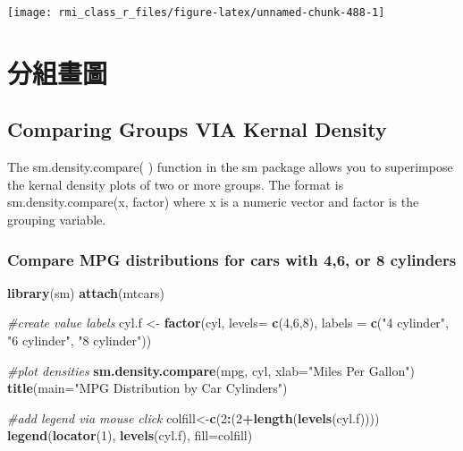 \documentclass[]{book}
\newenvironment{Shaded}{\begin{snugshade}}{\end{snugshade}}
\newcommand{\CommentTok}[1]{\textcolor[rgb]{0.56,0.35,0.01}{\textit{#1}}}
\newcommand{\DataTypeTok}[1]{\textcolor[rgb]{0.13,0.29,0.53}{#1}}
\newcommand{\DecValTok}[1]{\textcolor[rgb]{0.00,0.00,0.81}{#1}}
\newcommand{\KeywordTok}[1]{\textcolor[rgb]{0.13,0.29,0.53}{\textbf{#1}}}
\newcommand{\NormalTok}[1]{#1}
\newcommand{\OperatorTok}[1]{\textcolor[rgb]{0.81,0.36,0.00}{\textbf{#1}}}
\newcommand{\StringTok}[1]{\textcolor[rgb]{0.31,0.60,0.02}{#1}}
\theoremstyle{definition}
\theoremstyle{definition}
\theoremstyle{definition}
\theoremstyle{remark}
\begin{document}
\begin{center}\texttt{[image: rmi\_class\_r\_files/figure-latex/unnamed-chunk-488-1]} \end{center}

\section{分組畫圖}

\hypertarget{comparing-groups-via-kernal-density}{%
\subsection{Comparing Groups VIA Kernal
Density}\label{comparing-groups-via-kernal-density}}

The sm.density.compare( ) function in the sm package allows you to
superimpose the kernal density plots of two or more groups. The format
is sm.density.compare(x, factor) where x is a numeric vector and factor
is the grouping variable.

\hypertarget{compare-mpg-distributions-for-cars-with-46-or-8-cylinders}{%
\subsubsection{Compare MPG distributions for cars with 4,6, or 8
cylinders}\label{compare-mpg-distributions-for-cars-with-46-or-8-cylinders}}

\begin{Shaded}
\begin{Highlighting}[]
\KeywordTok{library}\NormalTok{(sm)}
\KeywordTok{attach}\NormalTok{(mtcars)}

\CommentTok{#create value labels }
\NormalTok{cyl.f <-}\StringTok{ }\KeywordTok{factor}\NormalTok{(cyl, }\DataTypeTok{levels=} \KeywordTok{c}\NormalTok{(}\DecValTok{4}\NormalTok{,}\DecValTok{6}\NormalTok{,}\DecValTok{8}\NormalTok{),}
  \DataTypeTok{labels =} \KeywordTok{c}\NormalTok{(}\StringTok{"4 cylinder"}\NormalTok{, }\StringTok{"6 cylinder"}\NormalTok{, }\StringTok{"8 cylinder"}\NormalTok{)) }

\CommentTok{#plot densities }
\KeywordTok{sm.density.compare}\NormalTok{(mpg, cyl, }\DataTypeTok{xlab=}\StringTok{"Miles Per Gallon"}\NormalTok{)}
\KeywordTok{title}\NormalTok{(}\DataTypeTok{main=}\StringTok{"MPG Distribution by Car Cylinders"}\NormalTok{)}

\CommentTok{#add legend via mouse click}
\NormalTok{colfill<-}\KeywordTok{c}\NormalTok{(}\DecValTok{2}\OperatorTok{:}\NormalTok{(}\DecValTok{2}\OperatorTok{+}\KeywordTok{length}\NormalTok{(}\KeywordTok{levels}\NormalTok{(cyl.f)))) }
\KeywordTok{legend}\NormalTok{(}\KeywordTok{locator}\NormalTok{(}\DecValTok{1}\NormalTok{), }\KeywordTok{levels}\NormalTok{(cyl.f), }\DataTypeTok{fill=}\NormalTok{colfill)}
\end{Highlighting}
\end{Shaded}
\end{document}
